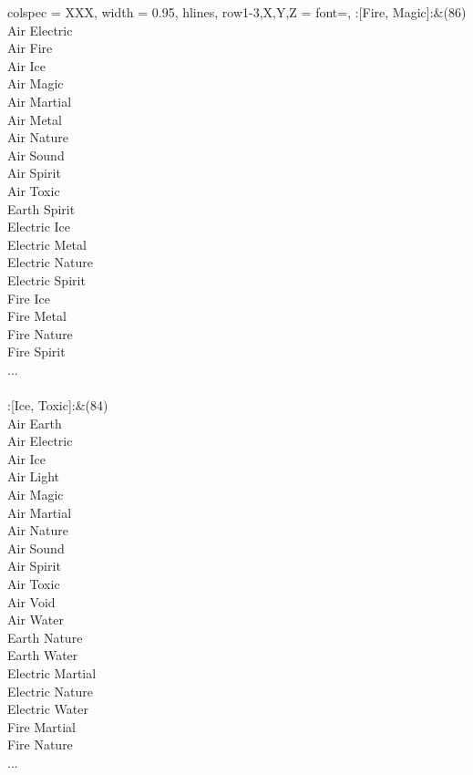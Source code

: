 \begin{longtblr}[
	caption = {2v2 Attacking Effective},
	label = {2v2-Attacking-Effective},
]{
	colspec = {XXX}, width = 0.95\linewidth,
	hlines,
	row{1-3,X,Y,Z} = {font=\bfseries},
}
	:[Fire, Magic]:&{(86)\\
	Air Electric \\
	Air Fire \\
	Air Ice \\
	Air Magic \\
	Air Martial \\
	Air Metal \\
	Air Nature \\
	Air Sound \\
	Air Spirit \\
	Air Toxic \\
	Earth Spirit \\
	Electric Ice \\
	Electric Metal \\
	Electric Nature \\
	Electric Spirit \\
	Fire Ice \\
	Fire Metal \\
	Fire Nature \\
	Fire Spirit \\
	...\\
	}\\

	:[Ice, Toxic]:&{(84)\\
	Air Earth \\
	Air Electric \\
	Air Ice \\
	Air Light \\
	Air Magic \\
	Air Martial \\
	Air Nature \\
	Air Sound \\
	Air Spirit \\
	Air Toxic \\
	Air Void \\
	Air Water \\
	Earth Nature \\
	Earth Water \\
	Electric Martial \\
	Electric Nature \\
	Electric Water \\
	Fire Martial \\
	Fire Nature \\
	...\\
	}\\


\end{longtblr}
